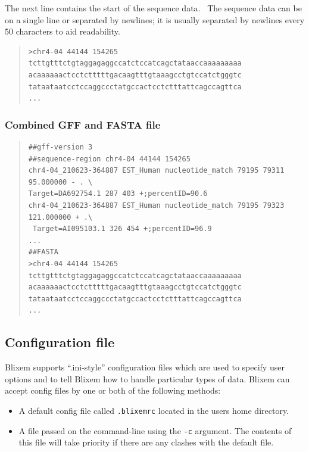 \documentclass[letterpaper]{article}
\newcommand\textstyleSourceText[1]{\texttt{#1}}
\newcommand\liststyleLi{%
\renewcommand\labelitemi{{\textbullet}}
\renewcommand\labelitemii{{\textbullet}}
\renewcommand\labelitemiii{{\textbullet}}
\renewcommand\labelitemiv{{\textbullet}}
}
\begin{document}
{The next line contains the start of the sequence data. \ The sequence
data can be on a single line or separated by newlines; it is usually
separated by newlines every 50 characters to aid readability.}

\bigskip

\begin{quote}
\begin{verbatim}
>chr4-04 44144 154265
tcttgtttctgtaggagaggccatctccatcagctataaccaaaaaaaaa
acaaaaaactcctctttttgacaagtttgtaaagcctgtccatctgggtc
tataataatcctccaggccctatgccactcctctttattcagccagttca
...
\end{verbatim}
\end{quote}

{\color[rgb]{0.30980393,0.5058824,0.7411765}\subsubsection[Combined GFF and FASTA file]{Combined GFF and FASTA file}}

\begin{quote}
\begin{verbatim}
##gff-version 3
##sequence-region chr4-04 44144 154265
chr4-04_210623-364887 EST_Human nucleotide_match 79195 79311 95.000000 - . \
Target=DA692754.1 287 403 +;percentID=90.6
chr4-04_210623-364887 EST_Human nucleotide_match 79195 79323 121.000000 + .\
 Target=AI095103.1 326 454 +;percentID=96.9
...
##FASTA
>chr4-04 44144 154265
tcttgtttctgtaggagaggccatctccatcagctataaccaaaaaaaaa
acaaaaaactcctctttttgacaagtttgtaaagcctgtccatctgggtc
tataataatcctccaggccctatgccactcctctttattcagccagttca
...
\end{verbatim}
\end{quote}

{\color[rgb]{0.30980393,0.5058824,0.7411765}\subsection[Configuration file]{Configuration file}}
{Blixem supports {\textquotedblleft}.ini-style{\textquotedblright}
configuration files which are used to specify user options and to tell
Blixem how to handle particular types of data. Blixem can accept
config files by one or both of the following methods:}

\liststyleLi
\begin{itemize}
\item {
A default config file called \textstyleSourceText{\textrm{.blixemrc}}
located in the user{\textquotesingle}s home directory. }
\item {
A file passed on the command-line using the
\textstyleSourceText{\textrm{{}-c}} argument. The contents of this file
will take priority if there are any clashes with the default file. }
\end{itemize}
\end{document}
